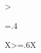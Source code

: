 \begin{xltabular}{\linewidth}{>{\hsize=.4\hsize\raggedright\arraybackslash}X>{\hsize=.6\hsize}X}
  \bottomrule
\end{xltabular}
\egroup


